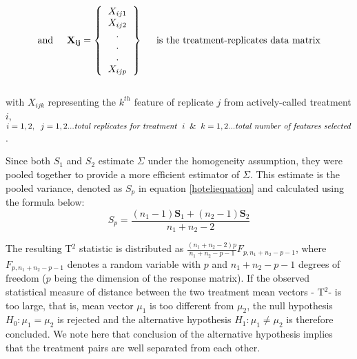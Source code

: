 \documentclass[11pt]{article}
\begin{document}
{\[ \mbox{and} \hspace{5mm}
\mathbf{X_{ij}}=
\left \{
\begin{tabular}{c}
$X_{ij1}$ \\
$X_{ij2}$ \\
.\\
.\\
.\\
$X_{ijp}$  \\
\end{tabular}
\right \} \hspace{5mm} \mbox{is the treatment-replicates data matrix}  
\]
\\ with $X_{ijk}$ representing the $k^{th}$ feature of replicate $j$ from actively-called treatment $i$, $i={1,2}, \hspace{2mm} j={1,2...\mbox{\textit{total replicates for treatment}} \hspace{2mm} i} \hspace{2mm} \& \hspace{2mm} k={1,2... \mbox{\textit{total number of features selected}}} $. }

\par{Since both $S_1$ and $S_2$ estimate $\Sigma$ under the homogeneity assumption, they were pooled together to provide a more efficient estimator of $\Sigma$. This estimate is the pooled variance, denoted as $S_p$ in equation \ref{hoteliequation} and calculated using the formula below: 
$$S_p= \frac{(n_1-1)\boldsymbol{S}_1+ (n_2-1)\boldsymbol{S}_2}{n_1+n_2-2}$$ 

The resulting T$^2$ statistic is distributed as $\frac{(n_1+n_2-2)p}{n_1+n_2-p-1}F_{p,n_1+n_2-p-1}$, where $F_{p,n_1+n_2-p-1}$ denotes a random variable with $p$ and $n_1+n_2-p-1$ degrees of freedom ($p$ being the dimension of the response matrix). If the observed statistical measure of distance between the two treatment mean vectors - T$^2$- is too large, that is, mean vector $\mu_1$ is too different from $\mu_2$, the null hypothesis $H_0: \mu_1= \mu_2$ is rejected and the alternative hypothesis $H_1: \mu_1 \ne \mu_2$ is therefore concluded. We note here that conclusion of the alternative hypothesis implies that the treatment pairs are well separated from each other. }
\end{document}
